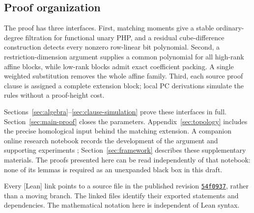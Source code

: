 \subsection{Proof organization}
The proof has three interfaces.
First, matching moments give a stable ordinary-degree filtration for
functional unary PHP, and a residual cube-difference construction detects
every nonzero row-linear bit polynomial.
Second, a restriction-dimension argument supplies a common polynomial for
all high-rank affine blocks, while low-rank blocks admit exact coefficient
packing. A single weighted substitution removes the whole affine family.
Third, each source proof clause is assigned a complete extension block;
local PC derivations simulate the rules without a proof-height cost.

Sections~\ref{sec:algebra}--\ref{sec:clause-simulation} prove these interfaces
in full. Section~\ref{sec:main-proof} closes the parameters.
Appendix~\ref{sec:topology} includes the precise homological input behind
the matching extension. A companion online research notebook records the
development of the argument and supporting experiments \cite{Repo};
Section~\ref{sec:framework} describes these supplementary materials.
The proofs presented here can be read independently of that notebook:
none of its lemmas is required as an unexpanded black box in this draft.

Every [Lean] link points to a source file in the published revision
\href{https://github.com/kbr-/math-research/tree/54f09378e97465522b7f1caf115f90ad1faa7a57}{\texttt{54f0937}}, rather than a moving
branch. The linked files identify their exported statements and dependencies.
The mathematical notation here is independent of Lean syntax.
